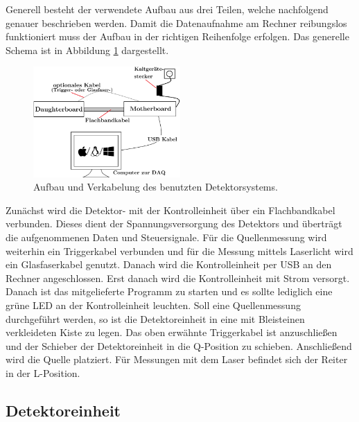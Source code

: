 Generell besteht der verwendete Aufbau aus drei Teilen, welche nachfolgend genauer beschrieben werden.
Damit die Datenaufnahme am Rechner reibungslos funktioniert muss der Aufbau in der richtigen Reihenfolge erfolgen.
Das generelle Schema ist in Abbildung \ref{fig:aufbau} dargestellt.

\begin{figure}
  \centering
  \includegraphics[width=0.5\textwidth]{content/graphics/aufbau.png}
  \caption{Aufbau und Verkabelung des benutzten Detektorsystems.}
  \label{fig:aufbau}
\end{figure}

Zunächst wird die Detektor- mit der Kontrolleinheit über ein Flachbandkabel verbunden.
Dieses dient der Spannungsversorgung des Detektors und überträgt die aufgenommenen Daten und Steuersignale.
Für die Quellenmessung wird weiterhin ein Triggerkabel verbunden und für die Messung mittels Laserlicht wird ein Glasfaserkabel genutzt.
Danach wird die Kontrolleinheit per USB an den Rechner angeschlossen.
Erst danach wird die Kontrolleinheit mit Strom versorgt.
Danach ist das mitgelieferte Programm zu starten und es sollte lediglich eine grüne LED an der Kontrolleinheit leuchten.
Soll eine Quellenmessung durchgeführt werden, so ist die Detektoreinheit in eine mit Bleisteinen verkleideten Kiste zu legen.
Das oben erwähnte Triggerkabel ist anzuschließen und der Schieber der Detektoreinheit in die Q-Position zu schieben.
Anschließend wird die Quelle platziert.
Für Messungen mit dem Laser befindet sich der Reiter in der L-Position.

\subsection{Detektoreinheit}


